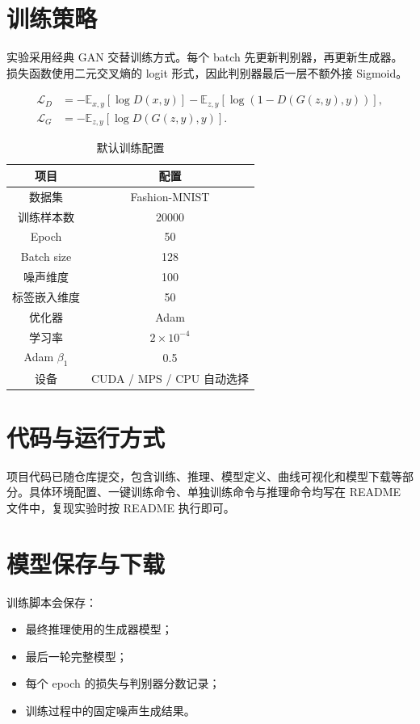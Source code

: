 \documentclass[a4paper,10pt,twocolumn]{article}
\begin{document}
\section{训练策略}
实验采用经典 GAN 交替训练方式。每个 batch 先更新判别器，再更新生成器。损失函数使用二元交叉熵的 logit 形式，因此判别器最后一层不额外接 Sigmoid。

\begin{align}
\mathcal{L}_D &= -\mathbb{E}_{x,y}[\log D(x,y)]-\mathbb{E}_{z,y}[\log(1-D(G(z,y),y))],\\
\mathcal{L}_G &= -\mathbb{E}_{z,y}[\log D(G(z,y),y)].
\end{align}

\begin{table}[H]
\centering
\small
\caption{默认训练配置}
\begin{tabular}{c|c}
\toprule
项目 & 配置 \\
\midrule
数据集 & Fashion-MNIST \\
训练样本数 & 20000 \\
Epoch & 50 \\
Batch size & 128 \\
噪声维度 & 100 \\
标签嵌入维度 & 50 \\
优化器 & Adam \\
学习率 & $2\times10^{-4}$ \\
Adam $\beta_1$ & 0.5 \\
设备 & CUDA / MPS / CPU 自动选择 \\
\bottomrule
\end{tabular}
\end{table}

\section{代码与运行方式}
项目代码已随仓库提交，包含训练、推理、模型定义、曲线可视化和模型下载等部分。具体环境配置、一键训练命令、单独训练命令与推理命令均写在 README 文件中，复现实验时按 README 执行即可。

\section{模型保存与下载}
训练脚本会保存：
\begin{itemize}
  \item 最终推理使用的生成器模型；
  \item 最后一轮完整模型；
  \item 每个 epoch 的损失与判别器分数记录；
  \item 训练过程中的固定噪声生成结果。
\end{itemize}
\end{document}
